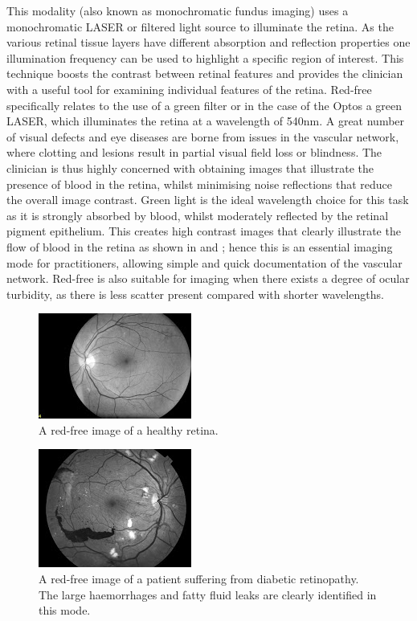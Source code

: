This modality (also known as monochromatic fundus imaging) uses a monochromatic
LASER or filtered light source to illuminate the retina. As the various retinal
tissue layers have different absorption and reflection properties one illumination
frequency can be used to highlight a specific region of interest. This technique
boosts the contrast between retinal features and provides the clinician with a
useful tool for examining individual features of the retina. Red-free specifically
relates to the use of a green filter or in the case of the Optos a green LASER,
which illuminates the retina at a wavelength of 540nm.\cite{4_bennett_2015}
A great number of visual defects and eye diseases are borne from issues in
the vascular network, where clotting and lesions result in partial visual
field loss or blindness. The clinician is thus highly concerned with obtaining
images that illustrate the presence of blood in the retina, whilst minimising
noise reflections that reduce the overall image contrast. Green light is the
ideal wavelength choice for this task as it is strongly absorbed by blood,
whilst moderately reflected by the retinal pigment epithelium. This creates
high contrast images that clearly illustrate the flow of blood in the retina
as shown in  and ; hence this is an essential
imaging mode for practitioners, allowing simple and quick documentation of
the vascular network. Red-free is also suitable for imaging when there exists
a degree of ocular turbidity, as there is less scatter present compared with
shorter wavelengths.

\begin{figure}[H]
\centering
\includegraphics{figures/redfree}
\caption{A red-free image of a healthy retina.}
\label{fig:red}
   \end{figure}

\begin{figure}[H]
\centering
\includegraphics{figures/redfreediabetic}
\caption{A red-free image of a patient suffering from diabetic retinopathy. The large haemorrhages and fatty fluid leaks are clearly identified in this mode.}
\label{fig:reddr}
   \end{figure}



